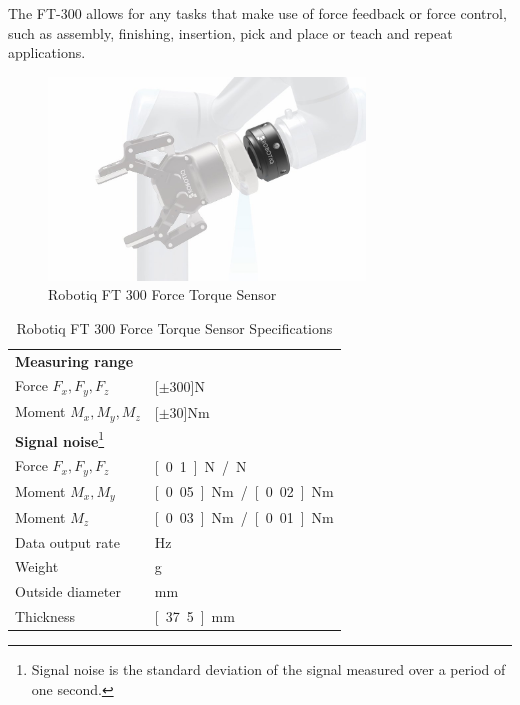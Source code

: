 The FT-300 allows for any tasks that make use of force feedback or force control, such as assembly, finishing, insertion, pick and place or teach and repeat applications.


\begin{figure}
   \centering
   \includegraphics[width=0.75\textwidth]{images/robotiq_ft.jpg}
   \caption{Robotiq FT 300 Force Torque Sensor}
   \label{pics:robotiq_ft}
\end{figure}

\begin{savenotes}
\begin{table}[h]
\begin{center}
 \caption{Robotiq FT 300 Force Torque Sensor Specifications}\vspace{1ex}
 \label{tab:robotiq_ft}
 \begin{tabular}{ll}
 \hline
 \textbf{Measuring range} & \\
 Force $F_x, F_y, F_z$ & \unit[$\pm 300$]{N} \\
 Moment $M_x, M_y, M_z$ & \unit[$\pm 30$]{Nm} \\ \hline
 \textbf{Signal noise}\footnote{Signal noise is the standard deviation of the signal measured over a period of one second.} &\\
 Force $F_x, F_y, F_z$ & \unit[0.1]{N} / \unit[1]{N} \\
 Moment $M_x, M_y$ & \unit[0.05]{Nm} / \unit[0.02]{Nm} \\
 Moment $M_z$ & \unit[0.03]{Nm} / \unit[0.01]{Nm} \\ \hline
 Data output rate & \unit[100]{Hz} \\
 Weight & \unit[300]{g}\\
 Outside diameter & \unit[75]{mm} \\
 Thickness & \unit[37.5]{mm} \\
 \hline
 \end{tabular}
\end{center}
\end{table}
\end{savenotes}

